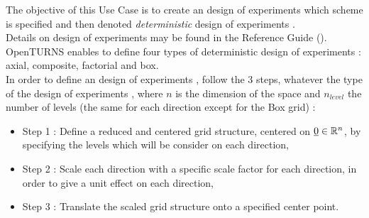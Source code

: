 \renewcommand{\filename}{docUC_MinMax_DetExperimentPlane.tex}
\renewcommand{\filetitle}{UC : Creation of a deterministic design of experiments  : Axial, Box, Composite, Factorial patterns}

\HeaderIIILevel

\label{determExpPlane}




The objective of this Use Case is to create an design of experiments  which scheme is specified and then denoted {\itshape deterministic} design of experiments .\\


Details on design of experiments  may be found in the Reference Guide ().\\

OpenTURNS enables to define four types of deterministic design of experiments : axial, composite, factorial and box.\\

In order to define an design of experiments , follow the 3  steps, whatever the type of the design of experiments , where $n$ is the dimension of the space and $n_{level}$ the number of levels (the same for each direction except for the Box grid) :
\begin{itemize}
\item Step 1 : Define a reduced and centered grid structure, centered on ${\underline{0}} \in {\mathbb R}^n$, by specifying the levels which will be consider on each direction,
\item Step 2 : Scale each direction with a specific scale factor for each direction, in order to give a unit effect on each direction,
\item Step 3 : Translate the scaled grid structure onto a specified center point.
\end{itemize}

